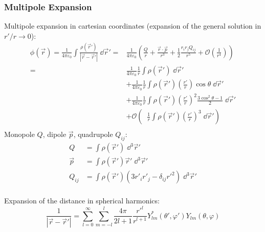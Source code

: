 		\subsubsection{Multipole Expansion}
			\noindent
			Multipole expansion in cartesian coordinates (expansion of the general solution in $r'/r \rightarrow 0$):
			\begin{equation}
				\begin{aligned}
					\phi(\vec{r}) = \frac{1}{4\pi\varepsilon_0}\int\frac{\rho(\vec{r}')}{\left|\vec{r}-\vec{r}'\right|}\;\dd \vec{r}'
					=& \frac{1}{4\pi\varepsilon_0}\left(\frac{Q}{r} + \frac{\vec{r}\cdot\vec{p}}{r^3} + \frac{1}{2}\frac{r_i r_j Q_{ij}}{r^5} + \mathcal{O} \left(\frac{1}{r^4}\right)\right) \\
					=& \frac{1}{4\pi\varepsilon_0}\frac{1}{r}\int\rho(\vec{r}')\;\dd \vec{r}' \\
					&+ \frac{1}{4\pi\varepsilon_0}\frac{1}{r}\int\rho(\vec{r}')\left(\frac{r'}{r}\right)\cos\theta\;\dd \vec{r}' \\
					&+ \frac{1}{4\pi\varepsilon_0}\frac{1}{r}\int\rho(\vec{r}')\left(\frac{r'}{r}\right)^2\frac{3\cos^2\theta-1}{2}\;\dd \vec{r}' \\
					&+ \mathcal{O}\left(\;\;\frac{1}{r}\int\rho(\vec{r}')\left(\frac{r'}{r}\right)^3 \;\dd \vec{r}'\right) \\
				\end{aligned}
			\end{equation}
			Monopole $Q$, dipole $\vec{p}$, quadrupole $Q_{ij}$:
			\begin{equation}
				\begin{aligned}
					Q &= \int \rho(\vec{r}') \;\dd^3 \vec{r}' \\
					\vec{p} &= \int \rho(\vec{r}')\vec{r}' \;\dd^3 \vec{r}' \\
					Q_{ij} &= \int \rho(\vec{r}')\left(3r'_i r'_j - \delta_{ij} r'^2 \right)	\;\dd^3 \vec{r}' \\
				\end{aligned}
			\end{equation}

			\noindent
			Expansion of the distance in spherical harmonics:
			\begin{equation}
				\frac{1}{\left|\vec{r}-\vec{r}'\right|}=\sum_{l=0}^{\infty}\sum_{m=-l}^{l} \frac{4\pi}{2l+1}\frac{r'^l}{r^{l+1}} Y^{*}_{lm}(\theta',\varphi')Y_{lm}(\theta,\varphi)
			\end{equation}


